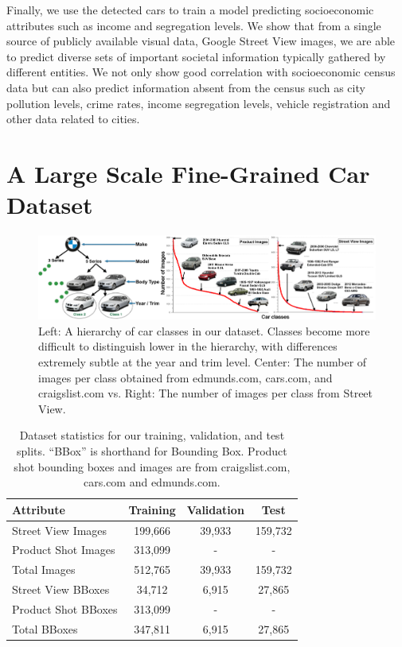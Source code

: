 \documentclass[letterpaper]{article}
\begin{document}
Finally, we use the detected cars to train a model predicting socioeconomic attributes such as income and segregation levels. We show that from a single source of publicly available visual data, Google Street View images, we are able to predict diverse sets of important societal information typically gathered by different entities. We not only show good correlation with socioeconomic census data but can also predict information absent from the census such as city pollution levels, crime rates, income segregation levels, vehicle registration and other data related to cities.

\section{A Large Scale Fine-Grained Car Dataset}

\begin{figure} [t]
\begin{center}
 \includegraphics[width=1\linewidth]{img/car_hierarchy.png}
\end{center}
\caption {Left: A hierarchy of car classes in our dataset. Classes become more difficult to distinguish lower in the hierarchy, with
differences extremely subtle at the year and trim level. Center: The number of images per class obtained from edmunds.com, cars.com,
and craigslist.com vs. Right: The number of images per class from Street View.}
\label{fig:img_dist}
\end{figure}

\begin{table}
\begin{center}
\begin{tabular}{|l|c|c|c|}
\hline
\textbf{Attribute} & \textbf{Training} & \textbf{Validation} & \textbf{Test} \\
\hline\hline
Street View Images & 199,666 & 39,933 &159,732\\
Product Shot Images & 313,099 & - &-\\
\hline\hline
Total Images &512,765&39,933&159,732\\
\hline\hline
Street View BBoxes & 34,712 & 6,915 &27,865\\
Product Shot BBoxes & 313,099 & - &-\\
\hline\hline
Total BBoxes & 347,811 & 6,915 &27,865\\
\hline
\end{tabular}
\end{center}
\caption{Dataset statistics for our training, validation, and test splits. ``BBox'' is shorthand for Bounding Box. Product shot bounding boxes and images are from craigslist.com, cars.com and edmunds.com.}
\label{table:data-stat}
\end{table}
\end{document}
